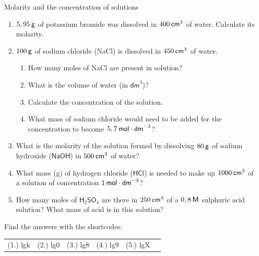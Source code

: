             \begin{exercises}{ Molarity and the concentration of solutions
      }
            \nopagebreak
      \label{m38712*id283713}\begin{enumerate}[noitemsep, label=\textbf{\arabic*}. ] 
            \label{m38712*uid92}\item $5,95\phantom{\rule{2pt}{0ex}}\mathsf{g}$ of potassium bromide was dissolved in $400\phantom{\rule{2pt}{0ex}}{\mathsf{cm}}^{3}$ of water. Calculate its molarity.\newline
\label{m38712*uid93}\item $100\phantom{\rule{2pt}{0ex}}\mathsf{g}$ of sodium chloride (NaCl) is dissolved in $450\phantom{\rule{2pt}{0ex}}{\mathsf{cm}}^{3}$ of water.
\label{m38712*id283768}\begin{enumerate}[noitemsep, label=\textbf{\alph*}. ] 
            \label{m38712*uid94}\item How many moles of NaCl are present in solution?
\label{m38712*uid95}\item What is the volume of water (in ${\mathsf{dm}}^{3}$)?
\label{m38712*uid96}\item Calculate the concentration of the solution.
\label{m38712*uid97}\item What mass of sodium chloride would need to be added for the concentration to become $5,7\phantom{\rule{2pt}{0ex}}\mathsf{mol}\ensuremath{\cdot}{\mathsf{dm}}^{-3}$?
\end{enumerate}
                \label{m38712*uid98}\item What is the molarity of the solution formed by dissolving $80\phantom{\rule{2pt}{0ex}}\mathsf{g}$ of sodium hydroxide ($\mathsf{NaOH}$) in $500\phantom{\rule{2pt}{0ex}}{\mathsf{cm}}^{3}$ of water?\newline
\label{m38712*uid99}\item What mass (g) of hydrogen chloride ($\mathsf{HCl}$) is needed to make up $1000\phantom{\rule{2pt}{0ex}}{\mathsf{cm}}^{3}$ of a solution of concentration $1\phantom{\rule{2pt}{0ex}}\mathsf{mol}\ensuremath{\cdot}{\mathsf{dm}}^{-3}$?\newline
\label{m38712*uid100}\item How many moles of $\mathsf{H}{}_{2}\mathsf{SO}{}_{4}$ are there in $250\phantom{\rule{2pt}{0ex}}{\mathsf{cm}}^{3}$ of a $0,8\phantom{\rule{2pt}{0ex}}\mathsf{M}$ sulphuric acid solution? What mass of acid is in this solution?\newline
\end{enumerate}
    \label{m38712*cid9}
\par {} Find the answers with the shortcodes:
 \par \begin{tabular}[h]{cccccc}
 (1.) lgk  &  (2.) lg0  &  (3.) lg8  &  (4.) lg9  &  (5.) lgX  & \end{tabular}
\end{exercises}

